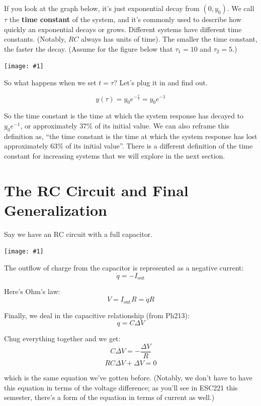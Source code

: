 \documentclass{report}
\newcommand{\bicture}[1]{
\begin{center}
    {\texttt{[image: \#1]}}
\end{center}}
\begin{document}
\begin{onehalfspacing}
\begin{flushleft}
If you look at the graph below, it's just exponential decay from \((0, y_0)\). We call \(\tau\) the \textbf{time constant} of the system, and it's commonly used to describe how quickly an exponential decays or grows. Different systems have different time constants. (Notably, \(RC\) always has units of time). The smaller the time constant, the faster the decay. (Assume for the figure below that \(\tau_1 = 10\) and \(\tau_2 = 5\).)

\bicture{2_exp}

So what happens when we set \(t=\tau\)? Let's plug it in and find out.

\[y(\tau) = y_0 e^{-\frac{\tau}{\tau}} = y_0 e^{-1}\]

So the time constant is the time at which the system response has decayed to \(y_0 e^{-1}\), or approximately 37\% of its initial value. We can also reframe this definition as, ``the time constant is the time at which the system response has lost approximately 63\% of its initial value''. There is a different definition of the time constant for increasing systems that we will explore in the next section.

\section{The RC Circuit and Final Generalization}

Say we have an RC circuit with a full capacitor. 

\bicture{2_rc}

The outflow of charge from the capacitor is represented as a negative current:
\vspace{-0.1in}
\[\dot{q} = -I_\text{out}\]

Here's Ohm's law:
\vspace{-0.1in}
\[V = I_\text{out} R = \dot{q} R\]

Finally, we deal in the capacitive relationship (from Ph213):
\vspace{-0.1in}
\[q = C\Delta V\]

Chug everything together and we get:
\vspace{-0.1in}
\[C\dot{\Delta V} = -\frac{\Delta V}{R}\]
\[\boxed{RC \dot{\Delta V} + \Delta V = 0}\]

which is the same equation we've gotten before. (Notably, we don't have to have this equation in terms of the voltage difference; as you'll see in ESC221 this semester, there's a form of the equation in terms of current as well.)


\end{flushleft}
\end{onehalfspacing}
\end{document}
